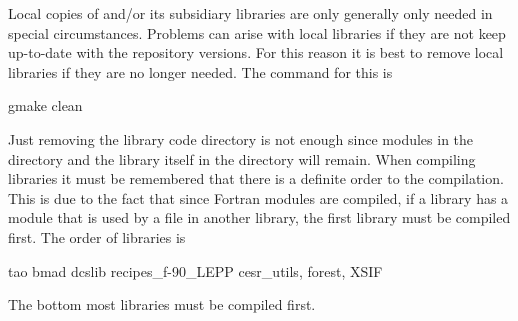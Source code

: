 Local copies of \bmad and/or its subsidiary libraries are only
generally only needed in special circumstances. Problems can arise
with local libraries if they are not keep up-to-date with the
repository versions. For this reason it is best to remove local
libraries if they are no longer needed. The command for this is
\begin{example}
  gmake clean
\end{example}
Just removing the library code directory is not enough since modules
in the  directory and the library itself in the 
directory will remain. When compiling libraries it must be remembered
that there is a definite order to the compilation. This is due to the
fact that since Fortran modules are compiled, if a library has a
module that is used by a file in another library, the first library
must be compiled first. The order of libraries is
\begin{example}
  tao
  bmad
  dcslib
  recipes_f-90_LEPP
  cesr_utils, forest, XSIF 
\end{example}
The bottom most libraries must be compiled first.
